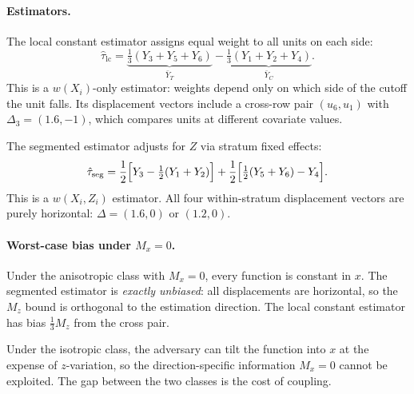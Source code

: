 \paragraph{Estimators.}
The local constant estimator assigns equal weight to all units on each side:
\begin{equation}\label{eq:lc_estimator}
	\hat\tau_{\mathrm{lc}} = \underbrace{\tfrac{1}{3}(Y_3 + Y_5 + Y_6)}_{\bar{Y}_T} - \underbrace{\tfrac{1}{3}(Y_1 + Y_2 + Y_4)}_{\bar{Y}_C}.
\end{equation}
This is a $w(X_i)$-only estimator: weights depend only on which side of the cutoff the unit falls.
Its displacement vectors include a cross-row pair $(u_6, u_1)$ with $\Delta_3 = (1.6, -1)$, which compares units at different covariate values.

The segmented estimator adjusts for $Z$ via stratum fixed effects:
\begin{equation}\label{eq:seg_estimator}
	\hat\tau_{\mathrm{seg}} = \frac{1}{2}\Bigl[Y_3 - \tfrac{1}{2}(Y_1 + Y_2)\Bigr] + \frac{1}{2}\Bigl[\tfrac{1}{2}(Y_5 + Y_6) - Y_4\Bigr].
\end{equation}
This is a $w(X_i, Z_i)$ estimator.
All four within-stratum displacement vectors are purely horizontal: $\Delta = (1.6, 0)$ or $(1.2, 0)$.

\paragraph{Worst-case bias under $M_x = 0$.}
Under the anisotropic class with $M_x = 0$, every function is constant in $x$.
The segmented estimator is \emph{exactly unbiased}: all displacements are horizontal, so the $M_z$ bound is orthogonal to the estimation direction.
The local constant estimator has bias $\tfrac{1}{3} M_z$ from the cross pair.

Under the isotropic class, the adversary can tilt the function into $x$ at the expense of $z$-variation, so the direction-specific information $M_x = 0$ cannot be exploited.
The gap between the two classes is the cost of coupling.




